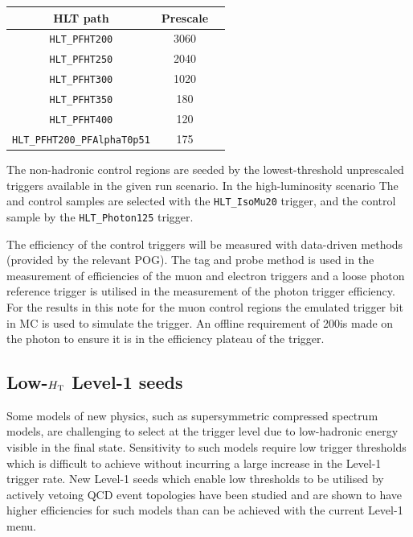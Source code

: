 \begin{table}[h!]
\footnotesize
\centering
\begin{tabular}{c|cc} 
\hline
\hline
HLT path & \multicolumn{1}{c}{Prescale} \\
\hline
\texttt{HLT\_PFHT200} & 3060 \\
\texttt{HLT\_PFHT250} & 2040 \\
\texttt{HLT\_PFHT300} & 1020 \\
\texttt{HLT\_PFHT350} & 180  \\
\texttt{HLT\_PFHT400} & 120  \\
\texttt{HLT\_PFHT200\_PFAlphaT0p51} & 175 \\
\hline
\hline

\end{tabular}
\label{tab:2015_Hadronic_Control_Triggers}
\end{table}


The non-hadronic control regions are seeded by the lowest-threshold unprescaled 
triggers available in the given run scenario. In the high-luminosity scenario The 
\mj and \mmj control samples are selected with the \verb!HLT_IsoMu20! trigger,
and the \gj control sample by the \verb!HLT_Photon125! trigger. 

The efficiency of the control triggers will be measured with data-driven methods
(provided by the relevant POG). The tag and probe method is used in the measurement of
efficiencies of the muon and electron triggers and a loose photon reference trigger 
is utilised in the measurement of the photon trigger efficiency. For the results in 
this note for the muon control regions the emulated trigger bit in MC is used to simulate 
the trigger. An offline \Pt requirement of 200\GeV is made on the photon
to ensure it is in the efficiency plateau of the trigger.








\subsection{Low-$\mbox{$H_\text{T}$}$ Level-1 seeds}

Some models of new physics, such as supersymmetric compressed spectrum models, are challenging to select at the trigger level due to low-hadronic energy visible in the final state. Sensitivity to such models require low trigger thresholds which is difficult to achieve without incurring a large increase in the Level-1 trigger rate. New Level-1 seeds which enable low thresholds to be utilised by actively vetoing QCD event topologies have been studied and are shown to have higher efficiencies for such models than can be achieved with the current Level-1 menu.

